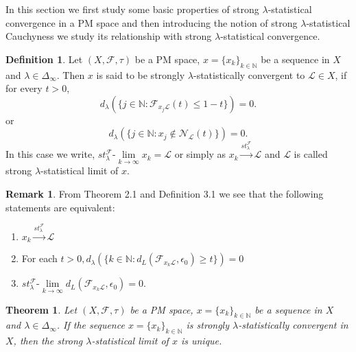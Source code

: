 \documentclass[reqno,b5paper]{amsart}
\theoremstyle{plain}
\newtheorem{thm}{Theorem}[section]
\theoremstyle{definition}
\newtheorem{defn}{Definition}[section]
\newtheorem{rem}{Remark}[section]
\begin{document}
In this section we first study some basic properties of strong
$\lambda$-statistical convergence in a PM space and then
introducing the notion of strong $\lambda$-statistical Cauchyness
we study its relationship with strong $\lambda$-statistical
convergence.
\begin{defn}\cite{Da3}
Let $(X,\mathcal{F},\tau)$ be a PM space,
$x=\{x_k\}_{k\in\mathbb{N}}$ be a sequence in $X$ and
$\lambda\in\Delta_\infty$. Then $x$ is said to be strongly
$\lambda$-statistically convergent to $\mathcal{L}\in X$, if for
every $t>0$,
$$d_\lambda(\{j\in \mathbb{N}: \mathcal{F}_{x_j\mathcal{L}}(t)\leq1-t\})=0.$$
or
$$d_\lambda(\{j\in \mathbb{N}: x_j \notin \mathcal{N}_\mathcal{L}(t)\})=0.$$
In this case we write,
$st_\lambda^{\mathcal{F}}$-$\lim\limits_{k\rightarrow \infty}x_k =
\mathcal{L} $ or simply as
$x_k\xrightarrow{st^\mathcal{F}_{\lambda}}\mathcal{L}$ and
$\mathcal{L}$ is called strong $\lambda$-statistical limit of $x$.
\end{defn}
\begin{rem}
From Theorem 2.1 and Definition 3.1 we see that the following
statements are equivalent:
\begin{enumerate}
    \item $x_k\xrightarrow{st^\mathcal{F}_{\lambda}}\mathcal{L}$
    \item For each $t>0,d_\lambda(\{k\in \mathbb{N}: d_L(\mathcal{F}_{x_k\mathcal{L}},\epsilon_0)\geq t\})=0$
    \item $ st^\mathcal{F}_\lambda\mbox{-}\lim\limits_{k\rightarrow\infty}d_L(\mathcal{F}_{x_k\mathcal{L}},\epsilon_0)=0$.
\end{enumerate}
\end{rem}
\begin{thm}
Let $(X,\mathcal{F},\tau)$ be a PM space, $x=\{x_k\}_{k
\in\mathbb{N}}$ be a sequence in $X$ and
$\lambda\in\Delta_\infty$. If the sequence $x=\{x_k\}_{k \in
\mathbb{N}}$ is strongly $\lambda$-statistically convergent in
$X$, then the strong $\lambda$-statistical limit of $x$ is unique.
\end{thm}
\end{document}

